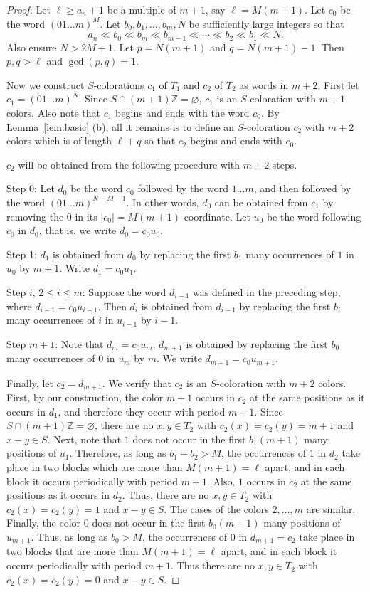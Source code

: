 \documentclass[11pt]{amsart}
\theoremstyle{definition}
\def\Z{\mathbb{Z}}
\def\Z{\mathbb{Z}}
\begin{document}
\begin{proof} Let $\ell\geq a_n+1$ be a multiple of $m+1$, say $\ell=M(m+1)$. Let $c_0$ be the word $(01\dots m)^M$. Let $b_0, b_1, \dots, b_m, N$ be sufficiently large integers so that
$$ a_n\ll b_0 \ll b_m \ll b_{m-1} \ll \cdots \ll b_2 \ll b_1 \ll N. $$
Also ensure $N> 2M+1$. Let $p=N(m+1)$ and $q=N(m+1)-1$. Then $p, q>\ell$ and $\gcd(p, q)=1$.

Now we construct $S$-colorations $c_1$ of $T_1$ and $c_2$ of $T_2$ as words in $m+2$. First let $c_1=(01\dots m)^N$. Since $S\cap (m+1)\Z=\varnothing$, $c_1$ is an $S$-coloration with $m+1$ colors. Also note that $c_1$ begins and ends with the word $c_0$. By Lemma~\ref{lem:basic} (b), all it remains is to define an $S$-coloration $c_2$ with $m+2$ colors which is of length $\ell+q$ so that $c_2$ begins and ends with $c_0$.

$c_2$ will be obtained from the following procedure with $m+2$ steps.

Step 0: Let $d_0$ be the word $c_0$ followed by the word $1\dots m$, and then followed by the word $(01\dots m)^{N-M-1}$. In other words, $d_0$ can be obtained from $c_1$ by removing the $0$ in its $|c_0|=M(m+1)$ coordinate. Let $u_0$ be the word following $c_0$ in $d_0$, that is, we write $d_0=c_0u_0$.

Step 1: $d_1$ is obtained from $d_0$ by replacing the first $b_1$ many occurrences of $1$ in $u_0$ by $m+1$. Write $d_1=c_0u_1$. 

Step $i$, $2\leq i\leq m$: Suppose the word $d_{i-1}$ was defined in the preceding step, where $d_{i-1}=c_0u_{i-1}$. Then $d_i$ is obtained from $d_{i-1}$ by replacing the first $b_i$ many occurrences of $i$ in $u_{i-1}$ by $i-1$.

Step $m+1$: Note that $d_m=c_0u_m$. $d_{m+1}$ is obtained by replacing the first $b_0$ many occurrences of $0$ in $u_m$ by $m$. We write $d_{m+1}=c_0u_{m+1}$.

Finally, let $c_2=d_{m+1}$. We verify that $c_2$ is an $S$-coloration with $m+2$ colors. First, by our construction, the color $m+1$ occurs in $c_2$ at the same positions as it occurs in $d_1$, and therefore they occur with period $m+1$. Since $S\cap (m+1)\Z=\varnothing$, there are no $x, y\in T_2$ with $c_2(x)=c_2(y)=m+1$ and $x-y\in S$. Next, note that $1$ does not occur in the first $b_1(m+1)$ many positions of $u_1$. Therefore, as long as $b_1-b_2>M$, the occurrences of $1$ in $d_2$ take place in two blocks which are more than $M(m+1)=\ell$ apart, and in each block it occurs periodically with period $m+1$. Also, $1$ occurs in $c_2$ at the same positions as it occurs in $d_2$. Thus, there are no $x, y\in T_2$ with $c_2(x)=c_2(y)=1$ and $x-y\in S$. The cases of the colors $2,\dots, m$ are similar. Finally, the color $0$ does not occur in the first $b_0(m+1)$ many positions of $u_{m+1}$. Thus, as long as $b_0>M$, the occurrences of $0$ in $d_{m+1}=c_2$ take place in two blocks that are more than $M(m+1)=\ell$ apart, and in each block it occurs periodically with period $m+1$. Thus there are no $x, y\in T_2$ with $c_2(x)=c_2(y)=0$ and $x-y\in S$. 


\end{proof}
\end{document}
